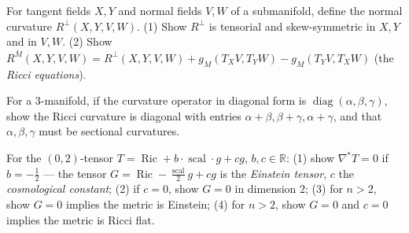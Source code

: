 \begin{remark}
  \label{rem:pet-ch3-ex-14}
  \leanok
  For tangent fields $X,Y$ and normal fields $V,W$ of a submanifold, define the
  normal curvature $R^\perp(X,Y,V,W)$. (1) Show $R^\perp$ is tensorial and
  skew-symmetric in $X,Y$ and in $V,W$. (2) Show
  $R^{\bar M}(X,Y,V,W)=R^\perp(X,Y,V,W)+g_M(T_XV,T_YW)-g_M(T_YV,T_XW)$ (the
  \emph{Ricci equations}).
\end{remark}

\begin{remark}
  \label{rem:pet-ch3-ex-15}
  \leanok
  For a $3$-manifold, if the curvature operator in diagonal form is
  $\operatorname{diag}(\alpha,\beta,\gamma)$, show the Ricci curvature is diagonal
  with entries $\alpha+\beta,\beta+\gamma,\alpha+\gamma$, and that
  $\alpha,\beta,\gamma$ must be sectional curvatures.
\end{remark}

\begin{remark}
  \label{rem:pet-ch3-ex-16}
  \leanok
  For the $(0,2)$-tensor $T=\operatorname{Ric}+b\cdot\operatorname{scal}\cdot
  g+cg$, $b,c\in\mathbb R$: (1) show $\nabla^*T=0$ if $b=-\tfrac12$ — the tensor
  $G=\operatorname{Ric}-\tfrac{\operatorname{scal}}2g+cg$ is the \emph{Einstein
  tensor}, $c$ the \emph{cosmological constant}; (2) if $c=0$, show $G=0$ in
  dimension $2$; (3) for $n>2$, show $G=0$ implies the metric is Einstein; (4)
  for $n>2$, show $G=0$ and $c=0$ implies the metric is Ricci flat.
\end{remark}

